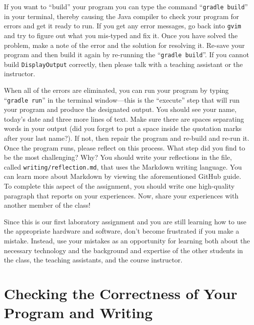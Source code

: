 \documentclass[11pt]{article}
\newcommand{\mainprogram}{\lstinline{DisplayOutput}}
\newcommand{\reflection}{\lstinline{writing/reflection.md}}
\newcommand{\gradlebuild}{\command{gradle build}}
\newcommand{\gradlerun}{\command{gradle run}}
\newcommand{\command}[1]{``\lstinline{#1}''}
\newcommand{\program}[1]{\lstinline{#1}}
\newcommand{\step}[1]{``{#1}''}
\begin{document}
If you want to \step{build} your program you can type the command \gradlebuild{} in your terminal, thereby causing the
Java compiler to check your program for errors and get it ready to run. If you get any error messages, go back into
\program{gvim} and try to figure out what you mis-typed and fix it. Once you have solved the problem, make a note of the
error and the solution for resolving it. Re-save your program and then build it again by re-running the \gradlebuild{}.
If you cannot build \mainprogram{} correctly, then please talk with a teaching assistant or the instructor.

When all of the errors are eliminated, you can run your program by typing \gradlerun{} in the terminal window---this is
the ``execute'' step that will run your program and produce the designated output. You should see your name, today's
date and three more lines of text. Make sure there are spaces separating words in your output (did you forget to put a
space inside the quotation marks after your last name?). If not, then repair the program and re-build and re-run it.
Once the program runs, please reflect on this process. What step did you find to be the most challenging? Why? You
should write your reflections in the file, called \reflection{}, that uses the Markdown writing language. You can learn
more about Markdown by viewing the aforementioned GitHub guide. To complete this aspect of the assignment, you should
write one high-quality paragraph that reports on your experiences. Now, share your experiences with another member of
the class!

Since this is our first laboratory assignment and you are still learning how to use the appropriate hardware and
software, don't become frustrated if you make a mistake. Instead, use your mistakes as an opportunity for learning both
about the necessary technology and the background and expertise of the other students in the class, the teaching
assistants, and the course instructor.

\section*{Checking the Correctness of Your Program and Writing}
\end{document}
